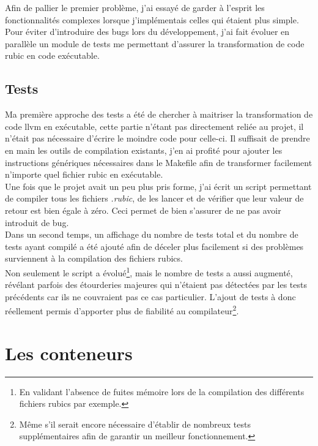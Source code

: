 \documentclass[12pt]{article}
\begin{document}
Afin de pallier le premier problème, j'ai essayé de garder à l'esprit les
fonctionnalités complexes lorsque j'implémentais celles qui étaient plus
simple.\\

Pour éviter d'introduire des bugs lors du développement, j'ai fait évoluer
en parallèle un module de tests me permettant d'assurer la transformation de
code rubic en code exécutable.

\subsection{Tests}

Ma première approche des tests a été de chercher à maitriser la
transformation de code llvm en exécutable, cette partie n'étant pas
directement reliée au projet, il n'était pas nécessaire d'écrire le moindre
code pour celle-ci. Il suffisait de prendre en main les outils de compilation
existants, j'en ai profité pour ajouter les instructions génériques
nécessaires dans le Makefile afin de transformer facilement n'importe quel
fichier rubic en exécutable.\\

Une fois que le projet avait un peu plus pris forme, j'ai écrit un script
permettant de compiler tous les fichiers {\em.rubic}, de les lancer et de
vérifier que leur valeur de retour est bien égale à zéro. Ceci permet de bien
s'assurer de ne pas avoir introduit de bug.\\

Dans un second temps, un affichage du nombre de tests total et du nombre de
tests ayant compilé a été ajouté afin de déceler plus facilement si des
problèmes surviennent à la compilation des fichiers rubics.\\

Non seulement le script a évolué\footnote{En validant l'absence de fuites
mémoire lors de la compilation des différents fichiers rubics par exemple.},
mais le nombre de tests a aussi augmenté, révélant parfois des étourderies
majeures qui n'étaient pas détectées par les tests précédents car ils ne
couvraient pas ce cas particulier. L'ajout de tests à donc réellement permis
d'apporter plus de fiabilité au compilateur\footnote{Même s'il serait encore
nécessaire d'établir de nombreux tests supplémentaires afin de garantir un
meilleur fonctionnement.}.

\section{Les conteneurs}
\end{document}
